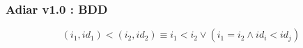 \documentclass[english, aspectratio=169]{beamer}
\begin{document}
\begin{frame}
  \frametitle{Adiar v1.0 : BDD}

  \begin{center}
    \begin{tikzpicture}[scale=0.9, every node/.style={transform shape}]
      
    \end{tikzpicture}
  \end{center}
  \vspace{20pt}\pause
  \begin{equation*}
    \label{eq:ordering}
    (i_1, \mathit{id}_1) < (i_2, \mathit{id}_2)
    \equiv
    i_1 < i_2 \vee (i_1 = i_2 \wedge \mathit{id}_i < \mathit{id}_j)
  \end{equation*}
\end{frame}
\end{document}
